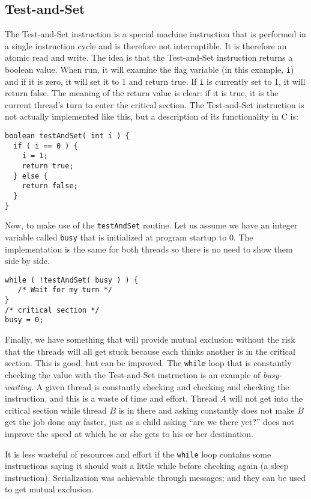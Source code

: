 \subsection*{Test-and-Set}
The Test-and-Set instruction is a special machine instruction that is performed in a single instruction cycle and is therefore not interruptible. It is therefore an atomic read and write. The idea is that the Test-and-Set instruction returns a boolean value. When run, it will examine the flag variable (in this example, \texttt{i}) and if it is zero, it will set it to 1 and return true. If \texttt{i} is currently set to 1, it will return false. The meaning of the return value is clear: if it is true, it is the current thread's turn to enter the critical section. The Test-and-Set instruction is not actually implemented like this, but a description of its functionality in C is:

\begin{verbatim}
boolean testAndSet( int i ) {
  if ( i == 0 ) {
    i = 1;
    return true;
  } else {
    return false;
  }
}
\end{verbatim}

Now, to make use of the \texttt{testAndSet} routine. Let us assume we have an integer variable called \texttt{busy} that is initialized at program startup to 0. The implementation is the same for both threads so there is no need to show them side by side.

\begin{verbatim}
while ( !testAndSet( busy ) ) {
   /* Wait for my turn */
}
/* critical section */
busy = 0;
\end{verbatim}

Finally, we have something that will provide mutual exclusion without the risk that the threads will all get stuck because each thinks another is in the critical section. This is good, but can be improved. The \texttt{while} loop that is constantly checking the value with the Test-and-Set instruction is an example of \textit{busy-waiting}. A given thread is constantly checking and checking and checking the instruction, and this is a waste of time and effort. Thread $A$ will not get into the critical section while thread $B$ is in there and asking constantly does not make $B$ get the job done any faster, just as a child asking ``are we there yet?'' does not improve the speed at which he or she gets to his or her destination.

It is less wasteful of resources and effort if the \texttt{while} loop contains some instructions saying it should wait a little while before checking again (a sleep instruction). Serialization was achievable through messages; and they can be used to get mutual exclusion.

